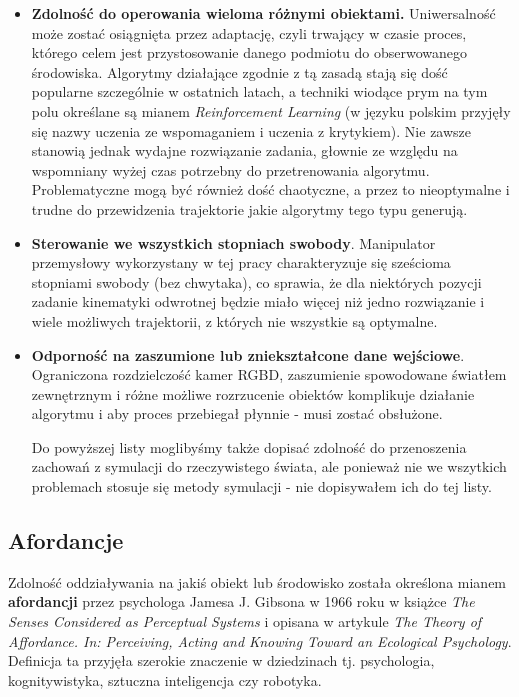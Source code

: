 \documentclass[12pt]{article}
\begin{document}
\begin{itemize}
\item \textbf{Zdolność do operowania wieloma różnymi obiektami.} Uniwersalność może zostać osiągnięta przez adaptację, czyli trwający w czasie proces, którego celem jest przystosowanie danego podmiotu do obserwowanego środowiska. Algorytmy działające zgodnie z tą zasadą stają się dość popularne szczególnie w ostatnich latach, a techniki wiodące prym na tym polu określane są mianem \emph{Reinforcement Learning} (w języku polskim przyjęły się nazwy uczenia ze wspomaganiem i uczenia z krytykiem). Nie zawsze stanowią jednak wydajne rozwiązanie zadania, głownie ze względu na wspomniany wyżej czas potrzebny do przetrenowania algorytmu. Problematyczne mogą być również dość chaotyczne, a przez to nieoptymalne i trudne do przewidzenia trajektorie jakie algorytmy tego typu generują.

\item \textbf{Sterowanie we wszystkich stopniach swobody}. Manipulator przemysłowy wykorzystany w tej pracy charakteryzuje się sześcioma stopniami swobody (bez chwytaka), co sprawia, że dla niektórych pozycji zadanie kinematyki odwrotnej będzie miało więcej niż jedno rozwiązanie i wiele możliwych trajektorii, z których nie wszystkie są optymalne.

\item \textbf{Odporność na zaszumione lub zniekształcone dane wejściowe}. Ograniczona rozdzielczość kamer RGBD, zaszumienie spowodowane światłem zewnętrznym i różne możliwe rozrzucenie obiektów komplikuje działanie algorytmu i aby proces przebiegał płynnie - musi zostać obsłużone.

Do powyższej listy moglibyśmy także dopisać zdolność do przenoszenia zachowań z symulacji do rzeczywistego świata, ale ponieważ nie we wszytkich problemach stosuje się metody symulacji - nie dopisywałem ich do tej listy.
\end{itemize}

\subsection{Afordancje}
Zdolność oddziaływania na jakiś obiekt lub środowisko została określona mianem \textbf{afordancji} przez psychologa Jamesa J. Gibsona w 1966 roku w książce \emph{The Senses Considered as Perceptual Systems} i opisana w artykule \emph{The  Theory  of  Affordance.  In:  Perceiving,  Acting  and  Knowing  Toward  an Ecological Psychology}. Definicja ta przyjęła szerokie znaczenie w dziedzinach tj. psychologia, kognitywistyka, sztuczna inteligencja czy robotyka.
\end{document}
